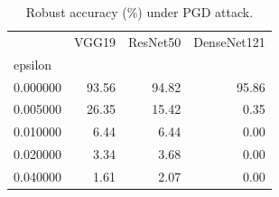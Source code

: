 \begin{table}
\caption{Robust accuracy (\%) under PGD attack.}
\begin{tabular}{lrrr}
\toprule
 & VGG19 & ResNet50 & DenseNet121 \\
epsilon &  &  &  \\
\midrule
0.000000 & 93.56 & 94.82 & 95.86 \\
0.005000 & 26.35 & 15.42 & 0.35 \\
0.010000 & 6.44 & 6.44 & 0.00 \\
0.020000 & 3.34 & 3.68 & 0.00 \\
0.040000 & 1.61 & 2.07 & 0.00 \\
\bottomrule
\end{tabular}
\end{table}
